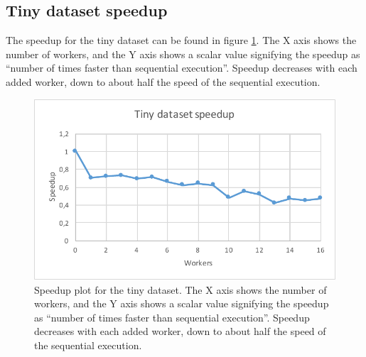 \subsection{Tiny dataset speedup}
The speedup for the tiny dataset can be found in figure \ref{fig:dataset_1_speedup}.
The X axis shows the number of workers, and the Y axis shows a scalar value signifying the speedup as
``number of times faster than sequential execution''. Speedup decreases with each added worker, down to about half the speed of the sequential execution.
\begin{figure}[ht]
  \centering
  \includegraphics[width=120mm]{figures/dataset_1/dataset_1_speedup.pdf}
  \caption[Speedup plot for tiny dataset.]{Speedup plot for the tiny dataset. The X axis shows the number of workers, and the Y axis shows a scalar value signifying the speedup as
  ``number of times faster than sequential execution''. Speedup decreases with each added worker, down to about half the speed of the sequential execution.}
  \label{fig:dataset_1_speedup}
\end{figure}

